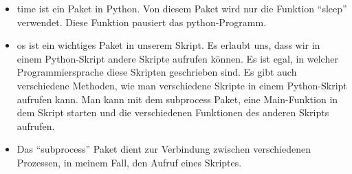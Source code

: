 \begin{enumerate}
\begin{itemize}
	 \item time ist ein Paket in Python. Von diesem Paket wird nur die Funktion ``sleep''  verwendet. Diese Funktion pausiert das python-Programm. \cite{timepackage}
	 
	 \item os ist ein wichtiges Paket in unserem Skript. Es erlaubt uns, dass wir in einem Python-Skript andere Skripte aufrufen k\"onnen. Es ist egal, in welcher Programmiersprache diese Skripten geschrieben sind. Es gibt auch verschiedene Methoden, wie man verschiedene Skripte in einem Python-Skript aufrufen kann. Man kann mit dem subprocess Paket, eine Main-Funktion in dem Skript starten und die verschiedenen Funktionen des anderen Skripts aufrufen. 
	 
	 \item Das ``subprocess'' Paket dient zur Verbindung zwischen verschiedenen Prozessen, in meinem Fall, den Aufruf eines Skriptes.
	 

\end{itemize}
\end{enumerate}
